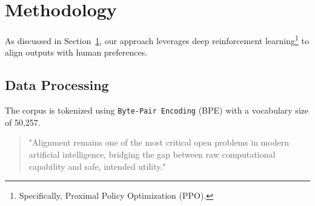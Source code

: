 \documentclass{article}
\begin{document}
\section{Methodology}\label{sec:methodology}
As discussed in Section~\ref{sec:methodology}, our approach leverages deep reinforcement learning\footnote{Specifically, Proximal Policy Optimization (PPO).} to align outputs with human preferences. 
\subsection{Data Processing}
The corpus is tokenized using \texttt{Byte-Pair Encoding} (BPE) with a vocabulary size of 50,257.
\begin{quote}
"Alignment remains one of the most critical open problems in modern artificial intelligence, bridging the gap between raw computational capability and safe, intended utility."
\end{quote}
\end{document}
